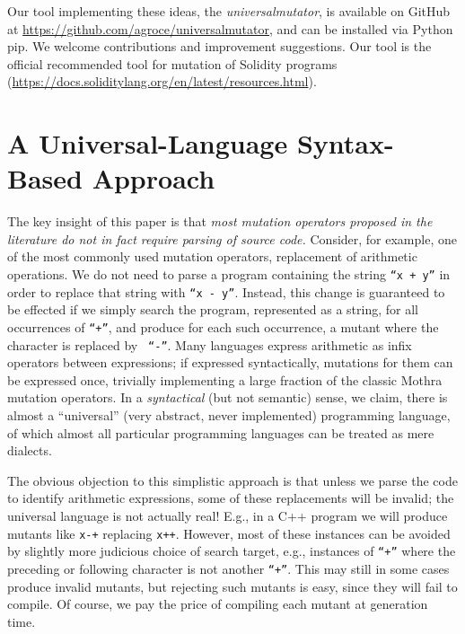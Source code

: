 \documentclass[acmsmall]{acmart}
\begin{document}
       Our tool implementing these ideas, the \emph{universalmutator}, is available on GitHub at
       \url{https://github.com/agroce/universalmutator}, and can be
       installed via Python pip.    We
       welcome contributions and improvement suggestions.  Our tool is
       the official recommended tool for mutation of Solidity programs (\url{https://docs.soliditylang.org/en/latest/resources.html}).

\section{A Universal-Language Syntax-Based Approach}

The key insight of this paper is that \emph{most mutation operators
  proposed in the literature do not in fact require parsing of source
  code.}  Consider, for example, one of the most commonly used
mutation operators, replacement of arithmetic operations.  We do not
need to parse a program containing the string {\tt ``x + y''} in order to
replace that string with {\tt ``x - y''}.  Instead, this change is
guaranteed to be effected if we simply search the program, represented
as a string, for all occurrences of  {\tt ``+''}, and produce for each
such occurrence, a mutant where the character is replaced by {\tt
  ``-''}.  Many languages express arithmetic as infix operators between
expressions; if expressed syntactically, mutations for them can be expressed
once, trivially implementing a large fraction of the classic Mothra~\cite{offutt1996experimental}
mutation operators.  In a \emph{syntactical} (but not semantic) sense, we claim, there is almost a ``universal'' (very
abstract, never implemented) programming language, of which almost all
particular programming languages can be treated as mere dialects.

The obvious objection to this simplistic approach is that unless we
parse the code to identify arithmetic expressions, some of these
replacements will be invalid; the universal language is not actually real!  E.g., in a C++ program we will produce
mutants like {\tt x-+} replacing {\tt x++}.  However, most of these
instances can be avoided by slightly more judicious choice of search
target, e.g., instances of {\tt ``+''} where the preceding or following
character is not another {\tt ``+''}.  This may still in some cases produce
invalid mutants, but rejecting such mutants is easy, since they will fail
to compile.  Of course, we pay the price of
compiling each mutant at generation
time.  
\end{document}
